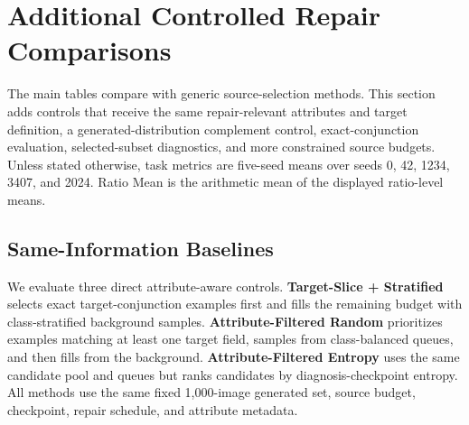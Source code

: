 \section{Additional Controlled Repair Comparisons}
\label{app:additional-repair-controls}

The main tables compare \model with generic source-selection methods. This section adds controls that receive the same repair-relevant attributes and target definition, a generated-distribution complement control, exact-conjunction evaluation, selected-subset diagnostics, and more constrained source budgets. Unless stated otherwise, task metrics are five-seed means over seeds 0, 42, 1234, 3407, and 2024. Ratio Mean is the arithmetic mean of the displayed ratio-level means.

\subsection{Same-Information Baselines}

We evaluate three direct attribute-aware controls. \textbf{Target-Slice + Stratified} selects exact target-conjunction examples first and fills the remaining budget with class-stratified background samples. \textbf{Attribute-Filtered Random} prioritizes examples matching at least one target field, samples from class-balanced queues, and then fills from the background. \textbf{Attribute-Filtered Entropy} uses the same candidate pool and queues but ranks candidates by diagnosis-checkpoint entropy. All methods use the same fixed 1,000-image generated set, source budget, checkpoint, repair schedule, and attribute metadata.

